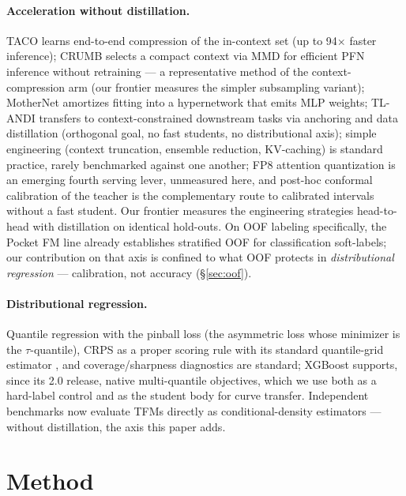 \documentclass[11pt]{article}
\begin{document}
\paragraph{Acceleration without distillation.} TACO \citep{taco2026}
learns end-to-end compression of the in-context set (up to 94$\times$
faster inference); CRUMB
\citep{crumb2026} selects a compact context via MMD for efficient PFN
inference without retraining --- a representative method of the context-compression arm (our
frontier measures the simpler subsampling variant); MotherNet
\citep{mothernet2023} amortizes fitting into a hypernetwork that emits MLP
weights; TL-ANDI \citep{tlandi2026} transfers to context-constrained downstream
tasks via anchoring and data distillation (orthogonal goal, no fast
students, no distributional axis); simple engineering
(context truncation, ensemble reduction, KV-caching) is standard
practice, rarely benchmarked against one another; FP8 attention
quantization \citep{kubler2026} is an emerging fourth serving lever,
unmeasured here, and post-hoc conformal calibration of the teacher
\citep{park2026} is the complementary route to calibrated intervals
without a fast student. Our
frontier measures the engineering strategies head-to-head with distillation
on identical hold-outs. On OOF labeling specifically, the Pocket FM line
\citep{pocketfm2026,pocketfmhealth2026} already establishes stratified
OOF for classification soft-labels; our contribution on that
axis is confined to what OOF protects in \emph{distributional regression}
--- calibration, not accuracy (\S\ref{sec:oof}).

\paragraph{Distributional regression.} Quantile regression with the
pinball loss \citep{koenker1978} (the asymmetric loss whose minimizer is
the $\tau$-quantile), CRPS as a proper scoring rule \citep{gneiting2007}
with its standard quantile-grid estimator \citep{gneiting2011}, and
coverage/sharpness diagnostics are standard; XGBoost \citep{chen2016}
supports, since its 2.0 release, native multi-quantile objectives, which
we use both as a hard-label control and as the student body for curve
transfer. Independent benchmarks now evaluate TFMs directly as
conditional-density estimators \citep{izbicki2026,landsgesell2026} ---
without distillation, the axis this paper adds.

\section{Method}
\label{sec:method}
\end{document}
